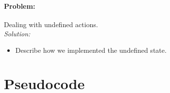 \paragraph{Problem:}
Dealing with undefined actions.
\\\textit{Solution:}
\begin{itemize}
    \item Describe how we implemented the undefined state.
\end{itemize}




\section{Pseudocode}


